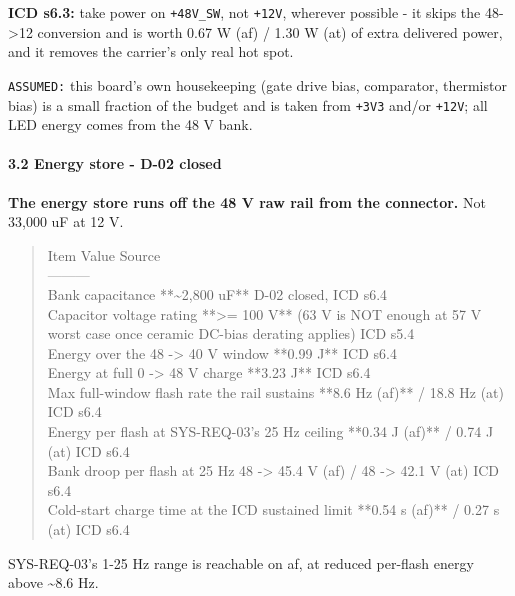\documentclass[11pt,a4paper]{article}
\begin{document}
\textbf{ICD s6.3:} take power on \texttt{+48V\_SW}, not \texttt{+12V}, wherever possible - it skips the 48-\textgreater{}12 conversion and is worth 0.67 W (af) / 1.30 W (at) of extra delivered power, and it removes the carrier's only real hot spot.

\texttt{ASSUMED:} this board's own housekeeping (gate drive bias, comparator, thermistor bias) is a small fraction of the budget and is taken from \texttt{+3V3} and/or \texttt{+12V}; all LED energy comes from the 48 V bank.

\paragraph*{3.2 Energy store - D-02 closed}
\textbf{The energy store runs off the 48 V raw rail from the connector.} Not 33,000 uF at 12 V.

\begin{quote}\small\ttfamily\raggedright
\textbar{} Item \textbar{} Value \textbar{} Source \textbar{}\\
\textbar{}---\textbar{}---\textbar{}---\textbar{}\\
\textbar{} Bank capacitance \textbar{} {*}{*}\textasciitilde{}2,800 uF{*}{*} \textbar{} D-02 closed, ICD s6.4 \textbar{}\\
\textbar{} Capacitor voltage rating \textbar{} {*}{*}\textgreater{}= 100 V{*}{*} (63 V is NOT enough at 57 V worst case once ceramic DC-bias derating applies) \textbar{} ICD s5.4 \textbar{}\\
\textbar{} Energy over the 48 -\textgreater{} 40 V window \textbar{} {*}{*}0.99 J{*}{*} \textbar{} ICD s6.4 \textbar{}\\
\textbar{} Energy at full 0 -\textgreater{} 48 V charge \textbar{} {*}{*}3.23 J{*}{*} \textbar{} ICD s6.4 \textbar{}\\
\textbar{} Max full-window flash rate the rail sustains \textbar{} {*}{*}8.6 Hz (af){*}{*} / 18.8 Hz (at) \textbar{} ICD s6.4 \textbar{}\\
\textbar{} Energy per flash at SYS-REQ-03's 25 Hz ceiling \textbar{} {*}{*}0.34 J (af){*}{*} / 0.74 J (at) \textbar{} ICD s6.4 \textbar{}\\
\textbar{} Bank droop per flash at 25 Hz \textbar{} 48 -\textgreater{} 45.4 V (af) / 48 -\textgreater{} 42.1 V (at) \textbar{} ICD s6.4 \textbar{}\\
\textbar{} Cold-start charge time at the ICD sustained limit \textbar{} {*}{*}0.54 s (af){*}{*} / 0.27 s (at) \textbar{} ICD s6.4 \textbar{}
\end{quote}
SYS-REQ-03's 1-25 Hz range is reachable on af, at reduced per-flash energy above \textasciitilde{}8.6 Hz.
\end{document}
